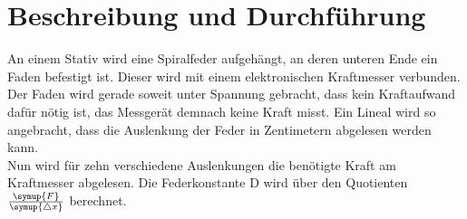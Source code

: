 \section{Beschreibung und Durchführung}
\label{sec:Durchführung}
An einem Stativ wird eine Spiralfeder aufgehängt, an deren unteren Ende ein Faden befestigt ist.
Dieser wird mit einem elektronischen Kraftmesser verbunden. 
Der Faden wird gerade soweit unter Spannung gebracht, dass kein Kraftaufwand dafür nötig ist, 
das Messgerät demnach keine Kraft misst.
Ein Lineal wird so angebracht, dass die Auslenkung der Feder in Zentimetern abgelesen werden kann. \\
Nun wird für zehn verschiedene Auslenkungen die benötigte Kraft am Kraftmesser abgelesen. 
Die Federkonstante D wird über den Quotienten $\frac{\symup{F}}{\symup{\triangle x}}$ berechnet. 